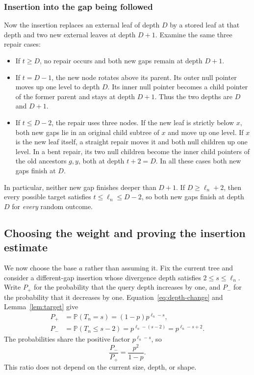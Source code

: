 \documentclass[11pt,a4paper]{article}
\theoremstyle{readable}
\newcommand{\Prob}{\mathbb P}
\begin{document}
\subsubsection*{Insertion into the gap being followed}
Now the insertion replaces an external leaf of depth $D$ by a stored
leaf at that depth and two new external leaves at depth $D+1$.
Examine the same three repair cases:
\begin{itemize}
  \item If $t\ge D$, no repair occurs and both new gaps remain at
        depth $D+1$.
  \item If $t=D-1$, the new node rotates above its parent. Its outer
        null pointer moves up one level to depth $D$. Its inner null
        pointer becomes a child pointer of the former parent and stays
        at depth $D+1$. Thus the two depths are $D$ and $D+1$.
  \item If $t\le D-2$, the repair uses three nodes. If the new leaf
        is strictly below $x$, both new gaps lie in an original child
        subtree of $x$ and move up one level. If $x$ is the new leaf
        itself, a straight repair moves it and both null children up
        one level. In a bent repair, its two null children become the
        inner child pointers of the old ancestors $g,y$, both at
        depth $t+2=D$. In all these cases both new gaps finish at $D$.
\end{itemize}
In particular, neither new gap finishes deeper than $D+1$. If
$D\ge\ell_n+2$, then every possible target satisfies
$t\le\ell_n\le D-2$, so both new gaps finish at depth $D$ for
\emph{every} random outcome.

\subsection{Choosing the weight and proving the insertion estimate}
\label{sec:weight-estimate}

We now choose the base $a$ rather than assuming it. Fix the current
tree and consider a different-gap insertion whose divergence depth
satisfies $2\le s\le\ell_n$. Write $P_+$ for the probability that
the query depth increases by one, and $P_-$ for the probability that
it decreases by one. Equation~\eqref{eq:depth-change} and
Lemma~\ref{lem:target} give
\begin{align*}
  P_+&=\Prob(T_n=s)=(1-p)p^{\ell_n-s},\\
  P_-&=\Prob(T_n\le s-2)=p^{\ell_n-(s-2)}
       =p^{\ell_n-s+2}.
\end{align*}
The probabilities share the positive factor $p^{\ell_n-s}$, so
\[
  \frac{P_-}{P_+}=\frac{p^2}{1-p}.
\]
This ratio does not depend on the current size, depth, or shape.
\end{document}
